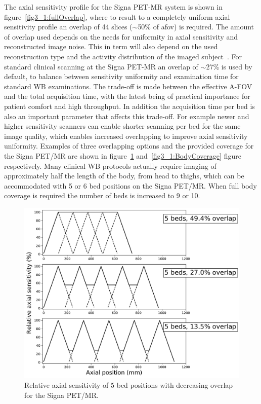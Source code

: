%
The axial sensitivity profile for the Signa PET-MR system is shown in figure~\ref{fig3_1:fullOverlap}, where to result to a completely uniform axial sensitivity profile an overlap of 44 slices ($\sim$50\% of \gls{afov}) is required.
The amount of overlap used depends on the needs for uniformity in axial sensitivity and reconstructed image noise. This in term will also depend on the used reconstruction type and the activity distribution of the imaged subject~\cite{Schubert1996}. 
For standard clinical scanning at the Signa PET-MR an overlap of $\sim$27\% is used by default, to balance between sensitivity uniformity and examination time for standard WB examinations. The trade-off is made between the effective A-FOV and the total acquisition time, with the latest being of practical importance for patient comfort and high throughput. In addition the acquisition time per bed is also an important parameter that affects this trade-off. For example newer and higher sensitivity scanners can enable shorter scanning per bed for the same image quality, which enables increased overlapping to improve axial sensitivity uniformity.
Examples of three overlapping options and the provided coverage for the Signa PET/MR are shown in figure~\ref{fig3_1:decreasingOverlap} and~\ref{fig3_1:BodyCoverage} figure respectively.
Many clinical WB protocols actually require imaging of approximately half the length of the body, from head to thighs, which can be accommodated with 5 or 6 bed positions on the Signa PET/MR. When full body coverage is required the number of beds is increased to 9 or 10. %
%
\begin{figure} [ht!]
\centering
\includegraphics[scale=0.5,angle=0]{2_Theory_Methods/figures/SensitivityProfiles_3Options.pdf}
\caption{Relative axial sensitivity of 5 bed positions with decreasing overlap for the Signa PET/MR.} 
\label{fig3_1:decreasingOverlap}
\end{figure}
